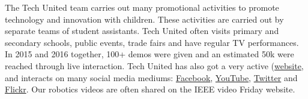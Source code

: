The Tech United team carries out many promotional activities to promote technology and innovation with children. These activities are carried out by separate teams of student assistants. Tech United often visits primary and secondary schools, public events, trade fairs and have regular TV performances. In 2015 and 2016 together, 100+ demos were given and an estimated 50k were reached through live interaction.
Tech United has also got a very active (\href{www.techunited.nl}{website}, and interacts on many social media mediums: \href{https://www.facebook.com/techunited}{Facebook}, \href{https://www.youtube.com/user/TechUnited}{YouTube}, \href{https://twitter.com/TechUnited}{Twitter} and \href{https://www.flickr.com/photos/techunited/}{Flickr}. Our robotics videos are often shared on the IEEE video Friday website.
